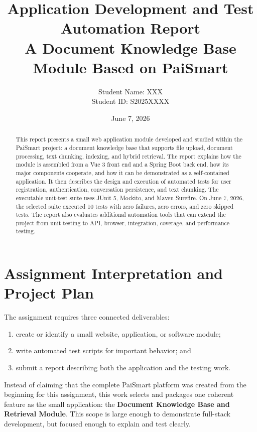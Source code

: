 \documentclass[11pt,a4paper]{article}
\title{\textbf{Application Development and Test Automation Report}\\
\large A Document Knowledge Base Module Based on PaiSmart}
\author{Student Name: XXX\\Student ID: S2025XXXX}
\date{June 7, 2026}
\begin{document}
\maketitle
\thispagestyle{empty}

\begin{abstract}
This report presents a small web application module developed and studied within the
PaiSmart project: a document knowledge base that supports file upload, document
processing, text chunking, indexing, and hybrid retrieval. The report explains how the
module is assembled from a Vue 3 front end and a Spring Boot back end, how its major
components cooperate, and how it can be demonstrated as a self-contained application.
It then describes the design and execution of automated tests for user registration,
authentication, conversation persistence, and text chunking. The executable unit-test
suite uses JUnit 5, Mockito, and Maven Surefire. On June 7, 2026, the selected suite
executed 10 tests with zero failures, zero errors, and zero skipped tests. The report
also evaluates additional automation tools that can extend the project from unit
testing to API, browser, integration, coverage, and performance testing.
\end{abstract}

\tableofcontents
\newpage

\section{Assignment Interpretation and Project Plan}

The assignment requires three connected deliverables:
\begin{enumerate}[leftmargin=2em]
  \item create or identify a small website, application, or software module;
  \item write automated test scripts for important behavior; and
  \item submit a report describing both the application and the testing work.
\end{enumerate}

Instead of claiming that the complete PaiSmart platform was created from the beginning
for this assignment, this work selects and packages one coherent feature as the small
application: the \textbf{Document Knowledge Base and Retrieval Module}. This scope is
large enough to demonstrate full-stack development, but focused enough to explain and
test clearly.
\end{document}

